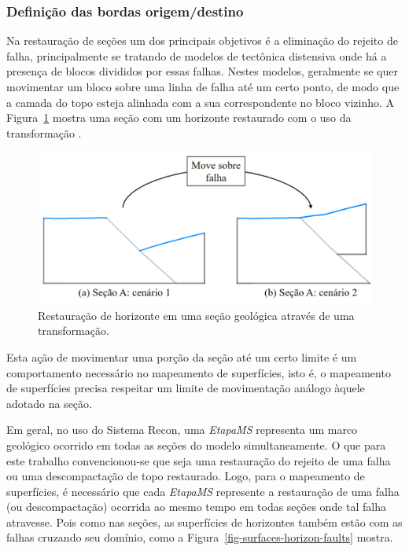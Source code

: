 \subsubsection{Definição das bordas origem/destino}

Na restauração de seções um dos principais objetivos é a eliminação do rejeito de falha, principalmente se tratando de modelos de tectônica distensiva onde há a presença de blocos divididos por essas falhas\cite{Santi}. Nestes modelos, geralmente se quer movimentar um bloco sobre uma linha de falha até um certo ponto, de modo que a camada do topo esteja alinhada com a sua correspondente no bloco vizinho. A Figura~\ref{fig-section-horizon-restored} mostra uma seção com um horizonte restaurado com o uso da transformação .

\begin{figure} [H]
  \begin{center}
    \includegraphics[width=350pt]{images/fig-section-horizon-restored}
    \caption{Restauração de horizonte em uma seção geológica através de uma transformação.}\label{fig-section-horizon-restored}
  \end{center}
\end{figure}

Esta ação de movimentar uma porção da seção até um certo limite é um comportamento necessário no mapeamento de superfícies, isto é, o mapeamento de superfícies precisa respeitar um limite de movimentação análogo àquele adotado na seção.

Em geral, no uso do Sistema Recon, uma \textit{EtapaMS} representa um marco geológico ocorrido em todas as seções do modelo simultaneamente. O que para este trabalho convencionou-se que seja uma restauração do rejeito de uma falha ou uma descompactação de topo restaurado. Logo, para o mapeamento de superfícies, é necessário que cada \textit{EtapaMS} represente a restauração de uma falha (ou descompactação) ocorrida ao mesmo tempo em todas seções onde tal falha atravesse. Pois como nas seções, as superfícies de horizontes também estão com as falhas cruzando seu domínio, como a Figura~\ref{fig-surfaces-horizon-faults} mostra.

